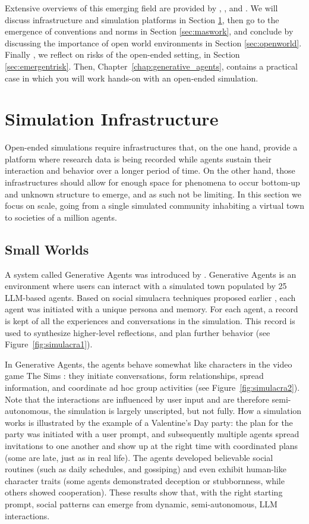Extensive overviews of this emerging field are provided by \citet{mou2024individual}, \citet{savarimuthu2024harnessing}, and \citet{xi2023rise}. We will discuss
infrastructure and simulation platforms in Section \ref{sec:emergentinfra}, then go to the emergence of conventions and norms in Section \ref{sec:maswork}, and conclude by discussing the importance of open world environments in Section \ref{sec:openworld}. Finally , we reflect on risks of the open-ended setting, in Section \ref{sec:emergentrisk}. 
Then, Chapter~\ref{chap:generative_agents}, contains a practical case in which you will work hands-on with an open-ended simulation.

\section{Simulation Infrastructure} \label{sec:emergentinfra}
Open-ended simulations require infrastructures that, on the one hand, provide a platform where research data is being recorded while agents sustain their interaction and behavior over a longer period of time. On the other hand, those infrastructures should allow for enough space for phenomena to occur bottom-up and unknown structure to emerge, and as such not be limiting. In this section we focus on %
scale, going from a single simulated community inhabiting a virtual town to societies of a million agents.

\subsection{Small Worlds}\label{sec:gen-agent}
A system called Generative Agents was introduced by \citet{park2023generative}. Generative Agents is an environment where users can interact with a simulated town populated by 25 LLM-based agents. Based on social simulacra techniques proposed earlier \citep{park2022social}, each agent was initiated with a unique persona and memory. For each agent, a record is kept of all the experiences and conversations in the simulation. This record is used to synthesize higher-level reflections, and plan further behavior (see Figure~\ref{fig:simulacra1}). 

In Generative Agents, the agents behave somewhat like characters in the video game The Sims \citep{nutt2003sims}: they initiate conversations, form relationships, spread information, and coordinate ad hoc group activities (see Figure~\ref{fig:simulacra2}). Note that the interactions are influenced by user input and are therefore semi-autonomous, the simulation is largely unscripted, but not fully. How a simulation works is illustrated by the  example of a Valentine’s Day party: the plan for the party was initiated with a user prompt, and subsequently multiple agents spread invitations to one another and show up at the right time with coordinated plans (some are late, just as in real life). The agents developed believable social routines (such as daily schedules, and gossiping) and even exhibit human-like character traits (some agents demonstrated deception or stubbornness, while others showed cooperation). These results show that, with the right starting prompt,  social patterns can emerge from dynamic, semi-autonomous, LLM interactions. 

